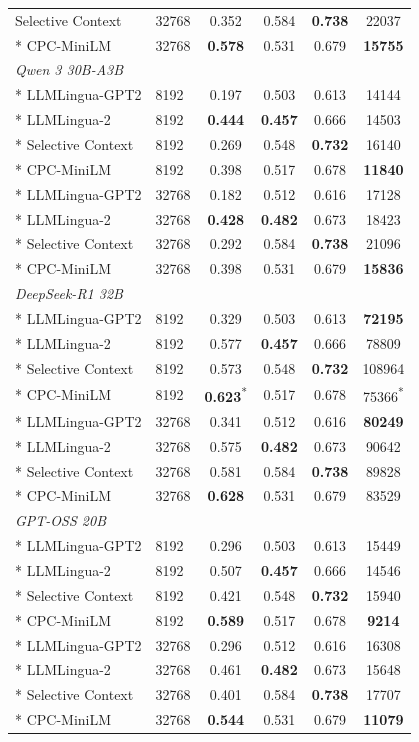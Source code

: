 {\begin{longtable}{llcccc}
Selective Context & 32768 & 0.352 & 0.584 & \textbf{0.738} & 22037 \\*
CPC-MiniLM        & 32768 & \textbf{0.578} & 0.531 & 0.679 & \textbf{15755} \\
\midrule
\multicolumn{6}{l}{\textit{Qwen 3 30B-A3B}} \\*
LLMLingua-GPT2    & 8192  & 0.197 & 0.503 & 0.613 & 14144 \\*
LLMLingua-2       & 8192  & \textbf{0.444} & \textbf{0.457} & 0.666 & 14503 \\*
Selective Context & 8192  & 0.269 & 0.548 & \textbf{0.732} & 16140 \\*
CPC-MiniLM        & 8192  & 0.398 & 0.517 & 0.678 & \textbf{11840} \\*
LLMLingua-GPT2    & 32768 & 0.182 & 0.512 & 0.616 & 17128 \\*
LLMLingua-2       & 32768 & \textbf{0.428} & \textbf{0.482} & 0.673 & 18423 \\*
Selective Context & 32768 & 0.292 & 0.584 & \textbf{0.738} & 21096 \\*
CPC-MiniLM        & 32768 & 0.398 & 0.531 & 0.679 & \textbf{15836} \\
\midrule
\multicolumn{6}{l}{\textit{DeepSeek-R1 32B}} \\*
LLMLingua-GPT2    & 8192  & 0.329 & 0.503 & 0.613 & \textbf{72195} \\*
LLMLingua-2       & 8192  & 0.577 & \textbf{0.457} & 0.666 & 78809 \\*
Selective Context & 8192  & 0.573 & 0.548 & \textbf{0.732} & 108964 \\*
CPC-MiniLM        & 8192  & \textbf{0.623}\textsuperscript{*} & 0.517 & 0.678 & 75366\textsuperscript{*} \\*
LLMLingua-GPT2    & 32768 & 0.341 & 0.512 & 0.616 & \textbf{80249} \\*
LLMLingua-2       & 32768 & 0.575 & \textbf{0.482} & 0.673 & 90642 \\*
Selective Context & 32768 & 0.581 & 0.584 & \textbf{0.738} & 89828 \\*
CPC-MiniLM        & 32768 & \textbf{0.628} & 0.531 & 0.679 & 83529 \\
\midrule
\multicolumn{6}{l}{\textit{GPT-OSS 20B}} \\*
LLMLingua-GPT2    & 8192  & 0.296 & 0.503 & 0.613 & 15449 \\*
LLMLingua-2       & 8192  & 0.507 & \textbf{0.457} & 0.666 & 14546 \\*
Selective Context & 8192  & 0.421 & 0.548 & \textbf{0.732} & 15940 \\*
CPC-MiniLM        & 8192  & \textbf{0.589} & 0.517 & 0.678 & \textbf{9214} \\*
LLMLingua-GPT2    & 32768 & 0.296 & 0.512 & 0.616 & 16308 \\*
LLMLingua-2       & 32768 & 0.461 & \textbf{0.482} & 0.673 & 15648 \\*
Selective Context & 32768 & 0.401 & 0.584 & \textbf{0.738} & 17707 \\*
CPC-MiniLM        & 32768 & \textbf{0.544} & 0.531 & 0.679 & \textbf{11079} \\
\end{longtable}
}

